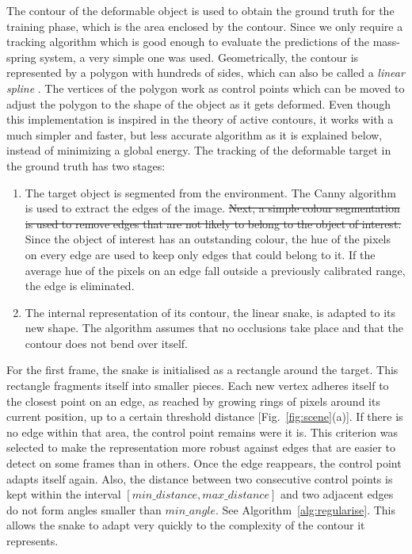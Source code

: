 \documentclass[journal]{IEEEtran}
\newcommand{\fref}[1]{Fig.~\ref{#1}}
\newcommand{\alref}[1]{Algorithm~\ref{#1}}
\newcounter{algorithm}
\newcommand{\comment}[1]{{\color{red} #1}}
\begin{document}
The contour of the deformable object is used to obtain the ground truth for the training phase, which is the area enclosed by the contour. \comment{Since we only require a tracking algorithm which is good enough to evaluate the predictions of the mass-spring system, a very simple one was used.}  Geometrically, the contour is represented by a polygon with hundreds of sides, which can also be called a \textit{linear spline} \comment{\cite{Menet1991}. The vertices of the polygon work as control points which can be moved to adjust the polygon to the shape of the object as it gets deformed.  Even though this implementation is inspired in the theory of active contours, it works with a much simpler and faster, but less accurate algorithm as it is explained below, instead of minimizing a global energy.}  The tracking of the deformable target in the ground truth has two stages:
\begin{enumerate}
 \item The target object is segmented from the environment.  The Canny algorithm is used to extract the edges of the image.  \comment{\sout{Next, a simple colour segmentation is used to remove edges that are not likely to belong to the object of interest.}  Since the object of interest has an outstanding colour, the hue of the pixels on every edge are used to keep only edges that could belong to it.  If the average hue of the pixels on an edge fall outside a previously calibrated range, the edge is eliminated.}
 \item The internal representation of its contour, the linear snake, is adapted to its new shape.  The algorithm assumes that no occlusions take place and that the contour does not bend over itself.
\end{enumerate}
For the first frame, the snake is initialised as a rectangle around the target. This rectangle fragments itself into smaller pieces. Each new vertex adheres itself to the closest point on an edge, as reached by growing rings of pixels around its current position, up to a certain threshold distance [\fref{fig:scene}(a)].  If there is no edge within that area, the control point remains were it is. This criterion was selected to make the representation more robust against edges that are easier to detect on some frames than in others.  Once the edge reappears, the control point adapts itself again.  Also, the distance between two consecutive control points is kept within the interval $[min\_distance, max\_distance]$ and two adjacent edges do not form angles smaller than $min\_angle$.  See \alref{alg:regularise}.  This allows the snake to adapt very quickly to the complexity of the contour it represents.
\end{document}

